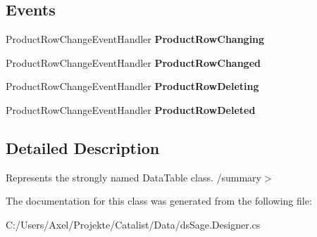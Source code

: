 \subsection*{Events}
\begin{DoxyCompactItemize}
\item 
Product\+Row\+Change\+Event\+Handler {\bfseries Product\+Row\+Changing}\hypertarget{class_products_1_1_data_1_1ds_sage_1_1_product_data_table_af3f825ad44661158d92571a35524e210}{}\label{class_products_1_1_data_1_1ds_sage_1_1_product_data_table_af3f825ad44661158d92571a35524e210}

\item 
Product\+Row\+Change\+Event\+Handler {\bfseries Product\+Row\+Changed}\hypertarget{class_products_1_1_data_1_1ds_sage_1_1_product_data_table_aff178a9121a80cc590707d0e9cb8af80}{}\label{class_products_1_1_data_1_1ds_sage_1_1_product_data_table_aff178a9121a80cc590707d0e9cb8af80}

\item 
Product\+Row\+Change\+Event\+Handler {\bfseries Product\+Row\+Deleting}\hypertarget{class_products_1_1_data_1_1ds_sage_1_1_product_data_table_a275fe4654fa472f35db98a4e179508c6}{}\label{class_products_1_1_data_1_1ds_sage_1_1_product_data_table_a275fe4654fa472f35db98a4e179508c6}

\item 
Product\+Row\+Change\+Event\+Handler {\bfseries Product\+Row\+Deleted}\hypertarget{class_products_1_1_data_1_1ds_sage_1_1_product_data_table_a4b6071010d98b0e1df290a9232f0b60d}{}\label{class_products_1_1_data_1_1ds_sage_1_1_product_data_table_a4b6071010d98b0e1df290a9232f0b60d}

\end{DoxyCompactItemize}


\subsection{Detailed Description}
Represents the strongly named Data\+Table class. /summary$>$ 

The documentation for this class was generated from the following file\+:\begin{DoxyCompactItemize}
\item 
C\+:/\+Users/\+Axel/\+Projekte/\+Catalist/\+Data/ds\+Sage.\+Designer.\+cs\end{DoxyCompactItemize}

